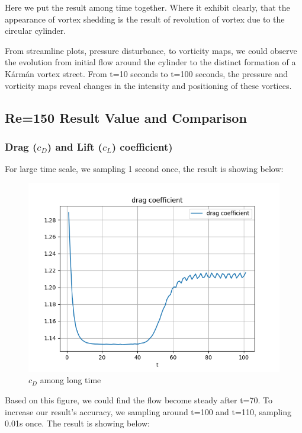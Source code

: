 \documentclass[12pt]{article}
\begin{document}
Here we put the result among time together. Where it exhibit clearly, that the appearance of vortex shedding is the result of revolution of vortex due to the circular cylinder. 

From streamline plots, pressure disturbance, to vorticity maps, we could observe the evolution from initial flow around the cylinder to the distinct formation of a Kármán vortex street. From t=10 seconds to t=100 seconds, the pressure and vorticity maps reveal changes in the intensity and positioning of these vortices.








\subsection{Re=150 Result Value and Comparison}



\subsubsection{Drag ($c_D$) and Lift ($c_L$) coefficient)}

For large time scale, we sampling 1 second once, the result is showing below:

\begin{figure}[H]
    \centering
    \includegraphics[width=0.45\linewidth]{figure/Analysis/N32_Re150_8x4/cd_largetime.jpg}
    \caption{$c_D$ among long time}
\end{figure}

Based on this figure, we could find the flow become steady after t=70. To increase our result's accuracy, we sampling around t=100 and t=110, sampling 0.01s once. The result is showing below: 
\end{document}
